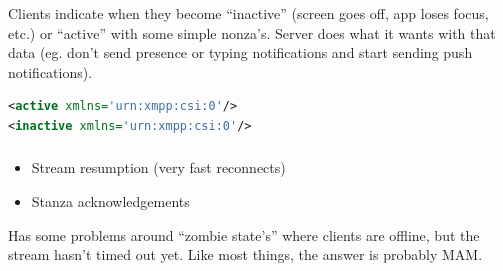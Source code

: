 \documentclass[xelatex,aspectratio=169]{beamer}
\begin{document}
\begin{frame}[fragile]
	\frametitle{}
	Clients indicate when they become ``inactive'' (screen goes off, app loses
	focus, etc.) or ``active'' with some simple nonza's. Server does what it wants
	with that data (eg. don't send presence or typing notifications and start
	sending push notifications).
	\vspace*{\fill}
\begin{lstlisting}[frame=single,language=xml]
<active xmlns='urn:xmpp:csi:0'/>
<inactive xmlns='urn:xmpp:csi:0'/>
\end{lstlisting}
\vspace*{\fill}
\end{frame}

\begin{frame}
	\frametitle{}
	\begin{itemize}
		\item Stream resumption (very fast reconnects)
		\item Stanza acknowledgements
	\end{itemize}

	Has some problems around ``zombie state's'' where clients are offline, but the
	stream hasn't timed out yet. Like most things, the answer is probably MAM.
\end{frame}
\end{document}
